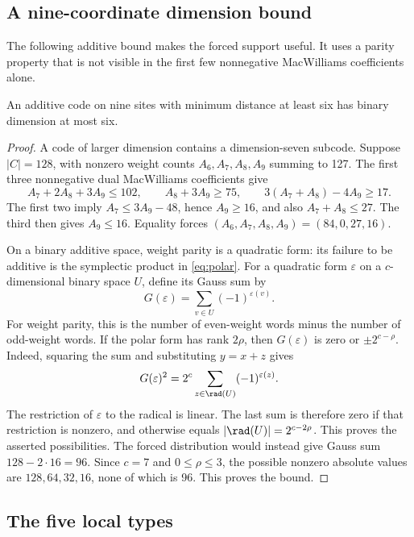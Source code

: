 \subsection{A nine-coordinate dimension bound}

The following additive bound makes the forced support useful. It uses a
parity property that is not visible in the first few nonnegative
MacWilliams coefficients alone.

\begin{lemma}\label{lem:nine-bound}
An additive code on nine sites with minimum distance at least six has
binary dimension at most six.
\end{lemma}
\begin{proof}
A code of larger dimension contains a dimension-seven subcode. Suppose
\(|C|=128\), with nonzero weight counts \(A_6,A_7,A_8,A_9\) summing to
127. The first three nonnegative dual MacWilliams coefficients give
\[
 A_7+2A_8+3A_9\leq102,\qquad
 A_8+3A_9\geq75,\qquad
 3(A_7+A_8)-4A_9\geq17.
\]
The first two imply \(A_7\leq3A_9-48\), hence \(A_9\geq16\), and
also \(A_7+A_8\leq27\). The third then gives \(A_9\leq16\).
Equality forces
\((A_6,A_7,A_8,A_9)=(84,0,27,16)\).

On a binary additive space, weight parity is a quadratic form: its failure
to be additive is the symplectic product in \eqref{eq:polar}.
For a quadratic form \(\varepsilon\) on a \(c\)-dimensional binary space \(U\),
define its Gauss sum by
\[
 G(\varepsilon)=\sum_{v\in U}(-1)^{\varepsilon(v)}.
\]
For weight parity, this is the number of even-weight words minus the
number of odd-weight words. If the polar form has rank \(2\rho\), then
\(G(\varepsilon)\) is zero or \(\pm2^{c-\rho}\). Indeed, squaring the sum and
substituting \(y=x+z\) gives
\[
 G(\varepsilon)^2=2^c\sum_{z\in\rad(U)}(-1)^{\varepsilon(z)}.
\]
The restriction of \(\varepsilon\) to the radical is linear. The last sum is
therefore zero if that restriction is nonzero, and otherwise equals
\(|\rad(U)|=2^{c-2\rho}\). This proves the asserted possibilities.
The forced distribution would instead give Gauss sum
\(128-2\cdot16=96\). Since \(c=7\) and \(0\leq\rho\leq3\),
the possible nonzero absolute values are \(128,64,32,16\), none of
which is 96. This proves the bound.
\end{proof}

\subsection{The five local types}\label{sec:types}

